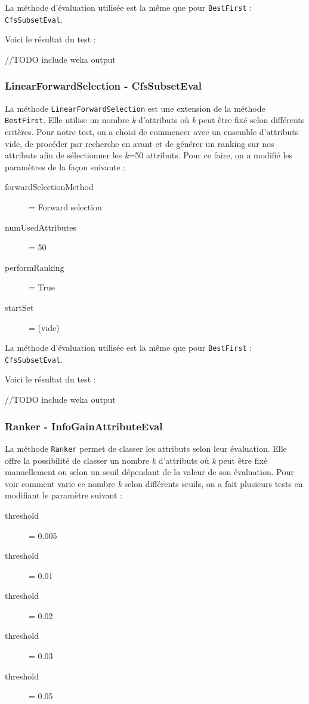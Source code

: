La méthode d'évaluation utilisée est la même que pour \texttt{BestFirst} : \texttt{CfsSubsetEval}.

Voici le résultat du test :

//TODO include weka output


\subsubsection{LinearForwardSelection - CfsSubsetEval}

La méthode \texttt{LinearForwardSelection} est une extension de la méthode \texttt{BestFirst}. Elle utilise un nombre \emph{k} d'attributs où \emph{k} peut être fixé selon différents critères. Pour notre test, on a choisi de commencer avec un ensemble d'attributs vide, de procéder par recherche en avant et de générer un \og ranking \fg{} sur nos attributs afin de sélectionner les \emph{k}=50 attributs. Pour ce faire, on a modifié les paramètres de la façon suivante : 
\begin{description}
	\item[forwardSelectionMethod] = Forward selection
	\item[numUsedAttributes] = 50
	\item[performRanking] = True
	\item[startSet] = (vide)	
\end{description}

La méthode d'évaluation utilisée est la même que pour \texttt{BestFirst} : \texttt{CfsSubsetEval}.

Voici le résultat du test :

//TODO include weka output


\subsubsection{Ranker - InfoGainAttributeEval}

La méthode \texttt{Ranker} permet de classer les attributs selon leur évaluation. Elle offre la possibilité de classer un nombre \emph{k} d'attributs où \emph{k} peut être fixé manuellement ou selon un seuil dépendant de la valeur de son évaluation. Pour voir comment varie ce nombre \emph{k} selon différents seuils, on a fait plusieurs tests en modifiant le paramètre suivant : 
\begin{description}
	\item[threshold] = 0.005	
	\item[threshold] = 0.01	
	\item[threshold] = 0.02	
	\item[threshold] = 0.03	
	\item[threshold] = 0.05	
\end{description}

